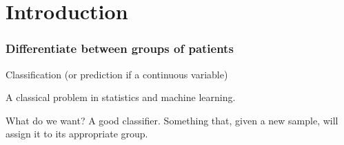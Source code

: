 \section[Intro classif.]{Introduction}
\begin{frame}
\frametitle{Differentiate between groups of patients}
Classification (or prediction if a continuous variable)

\vspace*{30pt}

A classical problem in statistics and machine learning.  

\vspace*{30pt}

What do we want? A good classifier. Something that, given a new sample,
will assign it to its appropriate group.

\end{frame}
 

